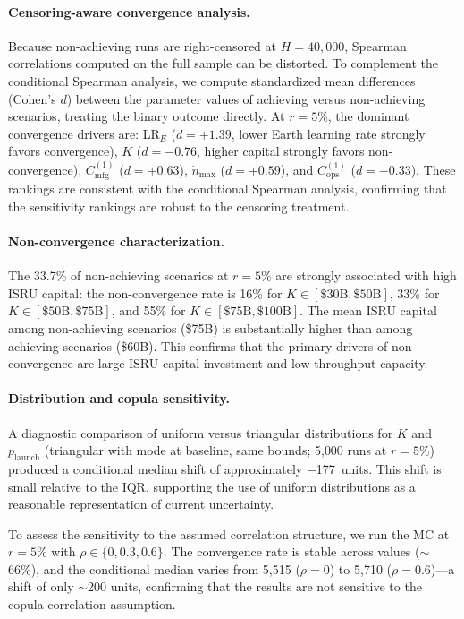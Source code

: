 \documentclass[preprint,12pt]{elsarticle}
\begin{document}
\paragraph{Censoring-aware convergence analysis.} Because non-achieving runs are right-censored at $H = 40{,}000$, Spearman correlations computed on the full sample can be distorted. To complement the conditional Spearman analysis, we compute standardized mean differences (Cohen's $d$) between the parameter values of achieving versus non-achieving scenarios, treating the binary outcome directly. At $r = 5\%$, the dominant convergence drivers are: LR$_E$ ($d = +1.39$, lower Earth learning rate strongly favors convergence), $K$ ($d = -0.76$, higher capital strongly favors non-convergence), $C_{\mathrm{mfg}}^{(1)}$ ($d = +0.63$), $\dot{n}_{\max}$ ($d = +0.59$), and $C_{\mathrm{ops}}^{(1)}$ ($d = -0.33$). These rankings are consistent with the conditional Spearman analysis, confirming that the sensitivity rankings are robust to the censoring treatment.

\paragraph{Non-convergence characterization.} The 33.7\% of non-achieving scenarios at $r = 5\%$ are strongly associated with high ISRU capital: the non-convergence rate is 16\% for $K \in [\$30\text{B}, \$50\text{B}]$, 33\% for $K \in [\$50\text{B}, \$75\text{B}]$, and 55\% for $K \in [\$75\text{B}, \$100\text{B}]$. The mean ISRU capital among non-achieving scenarios (\$75B) is substantially higher than among achieving scenarios (\$60B). This confirms that the primary drivers of non-convergence are large ISRU capital investment and low throughput capacity.

\paragraph{Distribution and copula sensitivity.} A diagnostic comparison of uniform versus triangular distributions for $K$ and $p_{\mathrm{launch}}$ (triangular with mode at baseline, same bounds; 5{,}000 runs at $r = 5\%$) produced a conditional median shift of approximately $-$177~units. This shift is small relative to the IQR, supporting the use of uniform distributions as a reasonable representation of current uncertainty.

To assess the sensitivity to the assumed correlation structure, we run the MC at $r = 5\%$ with $\rho \in \{0, 0.3, 0.6\}$. The convergence rate is stable across values ($\sim$66\%), and the conditional median varies from 5{,}515 ($\rho = 0$) to 5{,}710 ($\rho = 0.6$)---a shift of only $\sim$200 units, confirming that the results are not sensitive to the copula correlation assumption.
\end{document}
